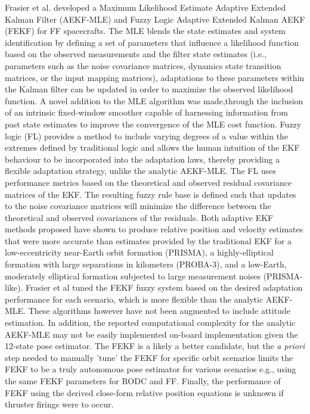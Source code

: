 Frasier et al. developed a Maximum Likelihood Estimate Adaptive Extended Kalman Filter (AEKF-MLE) and Fuzzy Logic Adaptive Extended Kalman AEKF (FEKF) for FF spacecrafts. The MLE blends the state estimates and system identification by defining a set of parameters that influence a likelihood function based on the observed measurements and the filter state estimates (i.e., parameters such as the noise covariance matrices, dynamics state transition matrices, or the input mapping matrices), adaptations to these parameters within the Kalman filter can be updated in order to maximize the observed likelihood function. A novel addition to the MLE algorithm was made,through the inclusion of an intrinsic fixed-window smoother capable of harnessing information from past state estimates to improve the convergence of the MLE cost function. Fuzzy logic (FL) provides a method to include varying degrees of a value within the extremes defined by traditional logic and allows the human intuition of the EKF behaviour to be incorporated into the adaptation laws, thereby providing a flexible adaptation strategy, unlike the analytic AEKF-MLE. The FL uses performance metrics based on the theoretical and observed residual covariance matrices of the EKF. The resulting fuzzy rule base is defined such that updates to the noise covariance matrices will minimize the difference between the theoretical and observed covariances of the residuals. Both adaptive EKF methods proposed have shown to produce relative position and velocity estimates that were more accurate than estimates provided by the traditional EKF for a low-eccentricity near-Earth orbit formation (PRISMA), a highly-elliptical formation with large separations in kilometers (PROBA-3), and a low-Earth, moderately elliptical formation subjected to large measurement noises (PRISMA-like). Frasier et al tuned the FEKF fuzzy system based on the desired adaptation performance for each scenario, which is more flexible than the analytic AEKF-MLE. These algorithms however have not been augmented to include attitude estimation. In addition, the reported computational complexity for the analytic AEKF-MLE may not be easily implemented on-board implementation given the 12-state pose estimator. The FEKF is a likely a better candidate, but the \textit{a priori} step needed to manually 'tune' the FEKF for specific orbit scenarios limits the FEKF to be a truly autonomous pose estimator for various scenarios e.g., using the same FEKF parameters for RODC and FF. Finally, the performance of FEKF using the derived close-form relative position equations is unknown if thruster firings were to occur.

